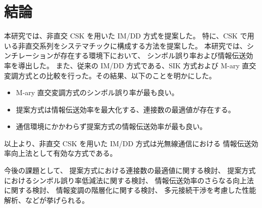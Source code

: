 ﻿\chapter{結論}
本研究では、非直交 CSK を用いた IM/DD 方式を提案した。
特に、CSK で用いる非直交系列をシステマチックに構成する方法を提案した。
本研究では、シンチレーションが存在する環境下において、
シンボル誤り率および情報伝送効率を導出した。
また、従来の IM/DD 方式である、SIK 方式および 
M-ary 直交変調方式との比較を行った。その結果、以下のことを明かにした。
%
\begin{itemize}
 \item M-ary 直交変調方式のシンボル誤り率が最も良い。
 \item 提案方式は情報伝送効率を最大化する、連接数の最適値が存在する。
 \item 通信環境にかかわらず提案方式の情報伝送効率が最も良い。
\end{itemize}
%
以上より、非直交 CSK を用いた IM/DD 方式は光無線通信における
情報伝送効率向上法として有効な方式である。

今後の課題として、
提案方式における連接数の最適値に関する検討、
提案方式におけるシンボル誤り率低減法に関する検討、
情報伝送効率のさらなる向上法に関する検討、
情報変調の階層化に関する検討、
多元接続干渉を考慮した性能解析、などが挙げられる。
